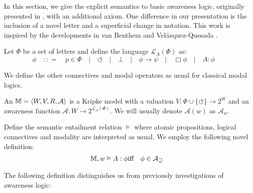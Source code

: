 In this section, we give the explicit semantics to basic awareness logic,
originally presented in {\cite{fagin_belief_1988}}, with an additional axiom.
 One difference in our presentation is the inclusion of a novel letter and a
superficial change in notation.  This work is inspired by the developments in
van Benthem and Vel\'azquez-Quesada {\cite{benthem_inference_2009}}.

\begin{definition}
  Let $\Phi$ be a set of letters and define the language $\mathcal{L}_A
  (\Phi)$ as:
  \[ \phi \hspace{1em} : : = \hspace{1em} p \in \Phi \hspace{1em} |
     \hspace{1em} \circlearrowleft \hspace{1em} | \hspace{1em} \bot
     \hspace{1em} | \hspace{1em} \phi \rightarrow \psi \hspace{1em} |
     \hspace{1em} \Box \phi \hspace{1em} | \hspace{1em} A : \phi \hspace{1em}
  \]
\end{definition}

We define the other connectives and modal operators as usual for classical
modal logics.

\begin{definition}
  \label{awarenessmodels}An {} $\mathbbm{M}= \langle
  W, V, R, \mathcal{A} \rangle$ is a Kripke model with a valuation $V : \Phi
  \cup \{\circlearrowleft\} \rightarrow 2^W$ and an awareness function
  $\mathcal{A} : W \rightarrow 2^{\mathcal{L}_A (\Phi)}$.  We will usually
  denote $\mathcal{A} (w)$ as $\mathcal{A}_w$.
  
  
  
  Define the semantic entailment relation $\vDash$ where atomic propositions,
  logical connectives and modality are interpreted as usual.  We employ the
  following novel definition:
  \begin{eqnarray*}
    \mathbbm{M}, w \vDash A : \phi & \text{iff} & \phi \in \mathcal{A_w}
  \end{eqnarray*}
\end{definition}

The following definition distinguishes us from previously investigations of
awareness logic:

